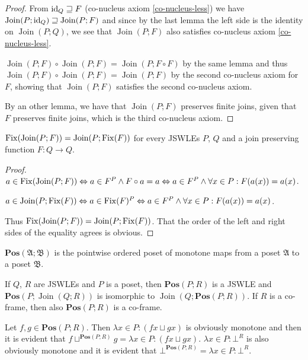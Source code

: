\begin{proof}
From $\operatorname{id}_{Q}\sqsupseteq F$ (co-nucleus axiom \ref{co-nucleus-less})
we have $\operatorname{Join}(P;\operatorname{id}_{Q})\sqsupseteq\operatorname{Join}(P;F)$
and since by the last lemma the left side is the identity on $\operatorname{Join}(P;Q)$,
we see that $\operatorname{Join}(P;F)$ also satisfies co-nucleus
axiom \ref{co-nucleus-less}.

$\operatorname{Join}(P;F)\circ\operatorname{Join}(P;F)=\operatorname{Join}(P;F\circ F)$
by the same lemma and thus $\operatorname{Join}(P;F)\circ\operatorname{Join}(P;F)=\operatorname{Join}(P;F)$
by the second co-nucleus axiom for $F$, showing that $\operatorname{Join}(P;F)$
satisfies the second co-nucleus axiom.

By an other lemma, we have that $\operatorname{Join}(P;F)$ preserves
finite joins, given that $F$ preserves finite joins, which is the
third co-nucleus axiom.\end{proof}
\begin{lem}
\label{join-fix-inter}$\operatorname{Fix}(\operatorname{Join}(P;F))=\operatorname{Join}(P;\operatorname{Fix}(F))$
for every JSWLEs $P$, $Q$ and a join preserving function $F:Q\rightarrow Q$.\end{lem}
\begin{proof}
$a\in\operatorname{Fix}(\operatorname{Join}(P;F))\Leftrightarrow a\in F^{P}\wedge F\circ a=a\Leftrightarrow a\in F^{P}\wedge\forall x\in P:F(a(x))=a(x)$.

$a\in\operatorname{Join}(P;\operatorname{Fix}(F))\Leftrightarrow a\in\operatorname{Fix}(F)^{P}\Leftrightarrow a\in F^{P}\wedge\forall x\in P:F(a(x))=a(x)$.

Thus $\operatorname{Fix}(\operatorname{Join}(P;F))=\operatorname{Join}(P;\operatorname{Fix}(F))$.
That the order of the left and right sides of the equality agrees
is obvious.\end{proof}
\begin{defn}
$\mathbf{Pos}(\mathfrak{A};\mathfrak{B})$ is the pointwise ordered
poset of monotone maps from a poset $\mathfrak{A}$ to a poset $\mathfrak{B}$.\end{defn}
\begin{lem}
\label{join-pos-interch}If $Q$, $R$ are JSWLEs and $P$ is a poset,
then $\mathbf{Pos}(P;R)$ is a JSWLE and $\mathbf{Pos}(P;\operatorname{Join}(Q;R))$
is isomorphic to $\operatorname{Join}\left(Q;\mathbf{Pos}(P;R)\right)$.
If $R$ is a co-frame, then also $\mathbf{Pos}(P;R)$ is a co-frame.
\end{lem}
Let $f,g\in\mathbf{Pos}(P;R)$. Then $\lambda x\in P:(fx\sqcup gx)$
is obviously monotone and then it is evident that $f\sqcup^{\mathbf{Pos}(P;R)}g=\lambda x\in P:(fx\sqcup gx)$.
$\lambda x\in P:\bot^{R}$ is also obviously monotone and it is evident
that $\bot^{\mathbf{Pos}(P;R)}=\lambda x\in P:\bot^{R}$.

